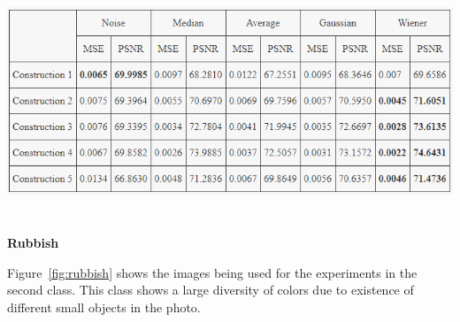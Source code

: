\begin{center}
\includegraphics[width=15cm,height=7cm]{images/Construction.png}
\label{tab:construction}
\end{center}

\newpage

\textbf{Rubbish}

Figure~\ref{fig:rubbish} shows the images being used for the experiments in the second class. This class shows a large diversity of colors due to existence of different small objects in the photo.

